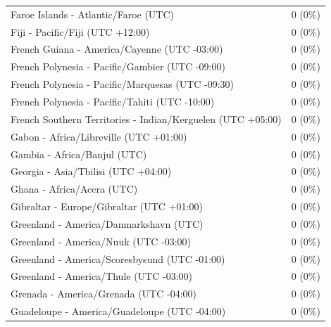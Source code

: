 \begin{appendix}
\begin{table}
{\begin{tabular}[t]{ll}
\addlinespace
\hspace{1em}Faroe Islands - Atlantic/Faroe (UTC) & 0 (0\%)\\
\hspace{1em}Fiji - Pacific/Fiji (UTC +12:00) & 0 (0\%)\\
\hspace{1em}French Guiana - America/Cayenne (UTC -03:00) & 0 (0\%)\\
\hspace{1em}French Polynesia - Pacific/Gambier (UTC -09:00) & 0 (0\%)\\
\hspace{1em}French Polynesia - Pacific/Marquesas (UTC -09:30) & 0 (0\%)\\
\addlinespace
\hspace{1em}French Polynesia - Pacific/Tahiti (UTC -10:00) & 0 (0\%)\\
\hspace{1em}French Southern Territories - Indian/Kerguelen (UTC +05:00) & 0 (0\%)\\
\hspace{1em}Gabon - Africa/Libreville (UTC +01:00) & 0 (0\%)\\
\hspace{1em}Gambia - Africa/Banjul (UTC) & 0 (0\%)\\
\hspace{1em}Georgia - Asia/Tbilisi (UTC +04:00) & 0 (0\%)\\
\addlinespace
\hspace{1em}Ghana - Africa/Accra (UTC) & 0 (0\%)\\
\hspace{1em}Gibraltar - Europe/Gibraltar (UTC +01:00) & 0 (0\%)\\
\hspace{1em}Greenland - America/Danmarkshavn (UTC) & 0 (0\%)\\
\hspace{1em}Greenland - America/Nuuk (UTC -03:00) & 0 (0\%)\\
\hspace{1em}Greenland - America/Scoresbysund (UTC -01:00) & 0 (0\%)\\
\addlinespace
\hspace{1em}Greenland - America/Thule (UTC -03:00) & 0 (0\%)\\
\hspace{1em}Grenada - America/Grenada (UTC -04:00) & 0 (0\%)\\
\hspace{1em}Guadeloupe - America/Guadeloupe (UTC -04:00) & 0 (0\%)\\

\end{tabular}}
\end{table}
\end{appendix}
